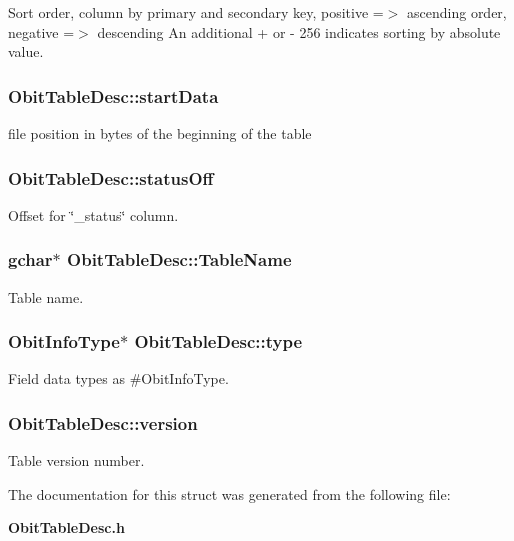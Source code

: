 Sort order, column by primary and secondary key, positive =$>$ ascending order, negative =$>$ descending An additional + or - 256 indicates sorting by absolute value. 

\subsubsection{ {\bf Obit\-Table\-Desc::start\-Data}}\label{structObitTableDesc_o8}


file position in bytes of the beginning of the table 

\subsubsection{ {\bf Obit\-Table\-Desc::status\-Off}}\label{structObitTableDesc_o25}


Offset for \char`\"{}\_\-status\char`\"{} column. 

\subsubsection{\setlength{\rightskip}{0pt plus 5cm}gchar$\ast$ {\bf Obit\-Table\-Desc::Table\-Name}}\label{structObitTableDesc_o21}


Table name. 

\subsubsection{\setlength{\rightskip}{0pt plus 5cm}Obit\-Info\-Type$\ast$ {\bf Obit\-Table\-Desc::type}}\label{structObitTableDesc_o20}


Field data types as \#Obit\-Info\-Type. 

\subsubsection{ {\bf Obit\-Table\-Desc::version}}\label{structObitTableDesc_o12}


Table version number. 



The documentation for this struct was generated from the following file:\begin{CompactItemize}
\item 
{\bf Obit\-Table\-Desc.h}\end{CompactItemize}
